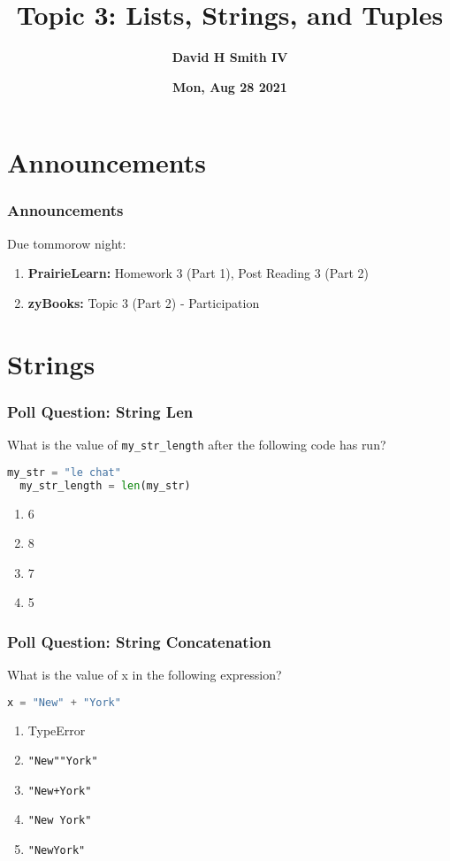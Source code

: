 \documentclass[xcolor=table]{beamer}
\title{\textbf{Topic 3: Lists, Strings, and Tuples}}
\author{\textbf{David H Smith IV}}
\institute[\textbf{UIUC}]{\textbf{University of Illinois Urbana-Champaign}}
\date{\textbf{Mon, Aug 28 2021}}
\begin{document}
\frame{\titlepage}

\section{Announcements}

%
%
\begin{frame}
  \frametitle{Announcements}
  Due tommorow night:
  \begin{enumerate}
    \item \textbf{PrairieLearn: } Homework 3 (Part 1), Post Reading 3 (Part 2)
    \item \textbf{zyBooks: } Topic 3 (Part 2) - Participation
  \end{enumerate}
\end{frame}

\section{Strings}

%
%
\begin{frame}[fragile]
  \frametitle{Poll Question: String Len}
  What is the value of \lstinline|my_str_length| after the following code has run?
  \begin{lstlisting}[language=Python, autogobble] 
  my_str = "le chat"
  my_str_length = len(my_str)
  \end{lstlisting}
  \vfill
  \begin{enumerate}[A]
    \item 6
    \item 8
    \item 7 
    \item 5
  \end{enumerate}
\end{frame}

%
%
\begin{frame}[fragile]
  \frametitle{Poll Question: String Concatenation}
  What is the value of x in the following expression?
  \begin{lstlisting}[language=Python, autogobble] 
  x = "New" + "York"
  \end{lstlisting}
  \vfill
  \begin{enumerate}[A] 
    \item TypeError
    \item \lstinline{"New""York"} 
    \item \lstinline{"New+York"} 
    \item \lstinline{"New York"} 
    \item \lstinline{"NewYork"} 
  \end{enumerate}
\end{frame}
\end{document}
